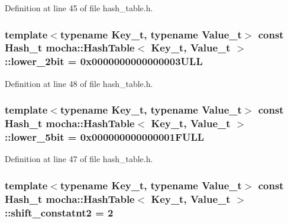 Definition at line 45 of file hash\_\-table.h.

\hypertarget{classmocha_1_1_hash_table_ae089c8e0a1e230fcd07895124e9af72a}{
\subsubsection[{lower\_\-2bit}]{\setlength{\rightskip}{0pt plus 5cm}template$<$typename Key\_\-t, typename Value\_\-t$>$ const {\bf Hash\_\-t} {\bf mocha::HashTable}$<$ Key\_\-t, Value\_\-t $>$::{\bf lower\_\-2bit} = 0x0000000000000003ULL}}
\label{classmocha_1_1_hash_table_ae089c8e0a1e230fcd07895124e9af72a}


Definition at line 48 of file hash\_\-table.h.

\hypertarget{classmocha_1_1_hash_table_a33bcad6d78ecde63a8c9a7aeb60dc90f}{
\subsubsection[{lower\_\-5bit}]{\setlength{\rightskip}{0pt plus 5cm}template$<$typename Key\_\-t, typename Value\_\-t$>$ const {\bf Hash\_\-t} {\bf mocha::HashTable}$<$ Key\_\-t, Value\_\-t $>$::{\bf lower\_\-5bit} = 0x000000000000001FULL}}
\label{classmocha_1_1_hash_table_a33bcad6d78ecde63a8c9a7aeb60dc90f}


Definition at line 47 of file hash\_\-table.h.

\hypertarget{classmocha_1_1_hash_table_ae452418e6b4593739a896b9de14e200f}{
\subsubsection[{shift\_\-constatnt2}]{\setlength{\rightskip}{0pt plus 5cm}template$<$typename Key\_\-t, typename Value\_\-t$>$ const {\bf Hash\_\-t} {\bf mocha::HashTable}$<$ Key\_\-t, Value\_\-t $>$::{\bf shift\_\-constatnt2} = 2}}
\label{classmocha_1_1_hash_table_ae452418e6b4593739a896b9de14e200f}


